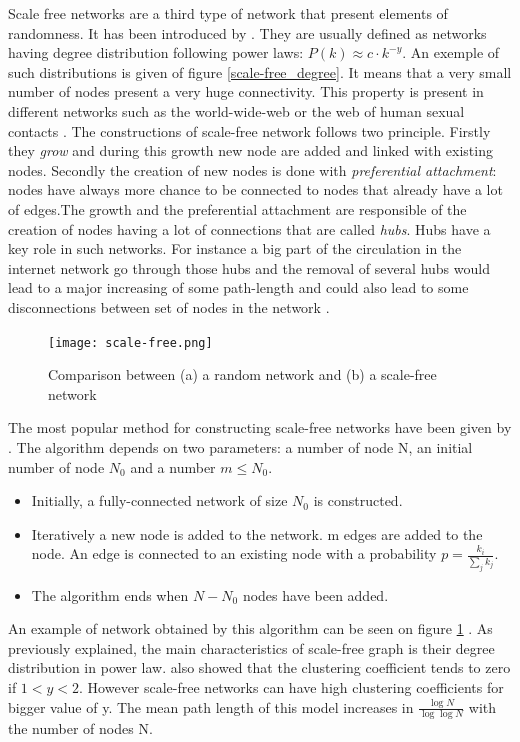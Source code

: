 \documentclass[a4paper, 12pt]{report}
\begin{document}
Scale free networks are a third type of network that present elements of randomness. It has been introduced by \cite{scale-free}. They are usually defined as networks having degree distribution following power laws: $ P(k) \approx c \cdot k^{-y}$. An exemple of such distributions is given of figure \ref{scale-free_degree}. It means that a very small number of nodes present a very huge connectivity.  This property is present in different networks such as the world-wide-web \citep{www} or the web of human sexual contacts \citep{sexual}. The constructions of scale-free network follows two principle. Firstly they \textit{grow} and during this growth new node are added and linked with existing nodes. Secondly the creation of new nodes is done with \textit{preferential  attachment}: nodes have always more chance to be connected to nodes that already have a lot of edges.The growth and the preferential attachment are responsible of the creation of nodes having a lot of connections that are called \textit{hubs}. Hubs have a key role in such networks. For instance a big part of the circulation in the internet network go through those hubs and the removal of several hubs would lead to a major increasing of some path-length and could also lead to some disconnections between set of nodes in the network \citep{general_scale-free}.\citep{general_scale_free2}\\

\begin{figure}
\centering
\texttt{[image: scale-free.png]}
\caption{Comparison between (a) a random network and (b) a scale-free network \citep{complex_networks}}
\label{scale-free_pictures}
\end{figure}

The most popular method for constructing scale-free networks have been given by \cite{barabasi_model}. The algorithm depends on two parameters: a number of node N, an initial number of node $N_0$ and a number $m \leq N_0$.\\
\begin{itemize}
\item Initially, a fully-connected network of size $N_0$ is constructed.
\item Iteratively a new node is added to the network. m edges are added to the node. An edge is connected to an existing node with a probability $p = \frac{k_i}{\sum_{j} k_j}$.
\item The algorithm ends when $N -N_0$ nodes have been added.
\end{itemize}
An example of network obtained by this algorithm can be seen on figure \ref{scale-free_pictures} . As previously explained, the main characteristics of scale-free graph is their degree distribution in power law. \cite{globalClustering2} also showed that the clustering coefficient tends to zero if $ 1 < y < 2$. However scale-free networks can have high clustering coefficients for bigger value of y. The mean path length of this model increases in $\frac{\log{N}}{\log{\log{N}}}$ with the number of nodes N.\\
\end{document}
